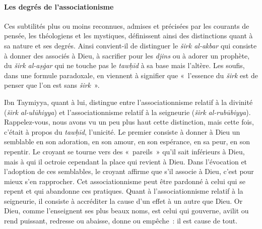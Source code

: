   \paragraph{Les degrés de l'associationisme}
  
  Ces subtilités plus ou moins reconnues, admises et précisées par les
courants de pensée, les théologiens et les mystiques, définissent ainsi
des distinctions quant à sa nature et ses degrés. Ainsi convient-il de
distinguer le \emph{širk al-akbar} qui consiste à donner des associés à
Dieu, à sacrifier pour les \emph{djins} ou à adorer un prophète, du
\emph{širk al-aṣġar} qui ne touche pas le \emph{tawḥīd} à sa base mais
l'altère. Les soufis, dans une formule paradoxale, en viennent à
signifier que «~l'essence du \emph{širk} est de penser que l'on est sans
\emph{širk}~». 
  
  
  Ibn
Taymiyya, quant à lui, distingue entre l'associationnisme relatif à la
divinité (\emph{širk al-ulūhiyya}) et l'associationnisme relatif à la
seigneurie (\emph{širk al-rubūbiyya}). Rappelez-vous, nous avons vu un peu plus
haut cette distinction, mais cette fois, c'était à propos du
\emph{tawḥīd}, l'unicité. Le premier consiste à donner à Dieu un
semblable en son adoration, en son amour, en son espérance, en sa peur,
en son repentir. Le croyant se tourne vers des «~pareils~» qu'il sait
inférieurs à Dieu, mais à qui il octroie cependant la place qui revient
à Dieu. Dans l'évocation et l'adoption de ces semblables, le croyant
affirme que s'il associe à Dieu, c'est pour mieux s'en rapprocher. Cet
associationnisme peut être pardonné à celui qui se repent et qui
abandonne ces pratiques. Quant à l'associationnisme relatif à la
seigneurie, il consiste à accréditer la cause d'un effet à un autre que
Dieu. Or Dieu, comme l'enseignent ses plus beaux noms, est celui qui
gouverne, avilit ou rend puissant, redresse ou abaisse, donne ou
empêche~: il est cause de tout.

